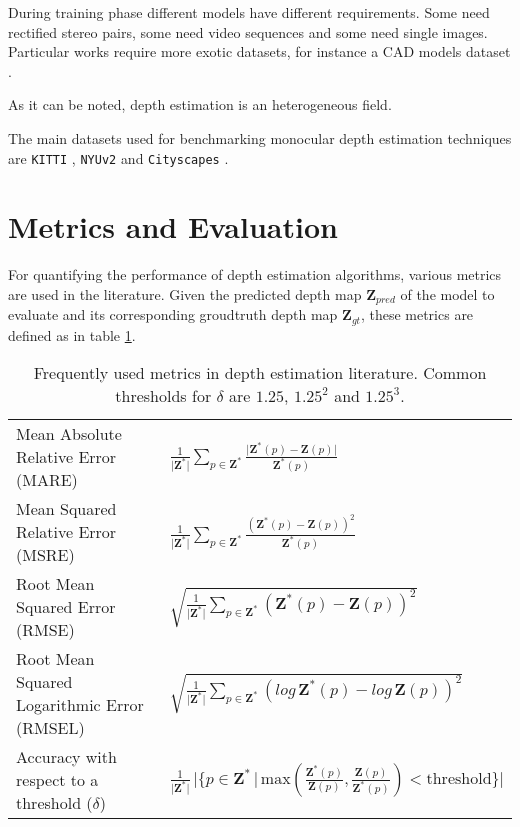 During training phase different models have different requirements. Some need rectified stereo pairs, some need video sequences and some need single images. Particular works require more exotic datasets, for instance a CAD models dataset \cite{IM2CAD}.

As it can be noted, depth estimation is an heterogeneous field.

The main datasets used for benchmarking monocular depth estimation techniques are \texttt{KITTI} \cite{KITTI}, \texttt{NYUv2} \cite{NYUv2} and \texttt{Cityscapes} \cite{Cityscapes}.

\section{Metrics and Evaluation}

For quantifying the performance of depth estimation algorithms, various metrics are used in the literature.
Given the predicted depth map $\mathbf{Z}_{pred}$ of the model to evaluate and its corresponding groudtruth depth map $\mathbf{Z}_{gt}$, these metrics are defined as in table \ref{t:metrics}.

\begingroup
\renewcommand{\arraystretch}{2.}
\begin{table}
	\begin{tabular}{l|l}
	Mean Absolute Relative Error (MARE) & $\frac{1}{\big| \mathbf{Z}^{*} \big|}\sum_{p \in \mathbf{Z}^{*}} \frac {\big| \mathbf{Z}^{*}(p) - \mathbf{Z}(p) \big|} {\mathbf{Z}^{*}(p)}$ \\
	Mean Squared Relative Error (MSRE) & $\frac{1}{\big| \mathbf{Z}^{*} \big|}\sum_{p \in \mathbf{Z}^{*}} \frac {\left( \mathbf{Z}^{*}(p) - \mathbf{Z}(p) \right)^{2}} {\mathbf{Z}^{*}(p)}$ \\
	Root Mean Squared Error (RMSE) & $\sqrt{
		\frac{1}{\big| \mathbf{Z}^{*} \big|}\sum_{p \in \mathbf{Z}^{*}} \left( \mathbf{Z}^{*}(p) - \mathbf{Z}(p) \right)^{2}
	}$ \\
	Root Mean Squared Logarithmic Error (RMSEL) & $\sqrt{
		\frac{1}{\big| \mathbf{Z}^{*} \big|}\sum_{p \in \mathbf{Z}^{*}} \left( log \, \mathbf{Z}^{*}(p) - log \, \mathbf{Z}(p) \right)^{2}
	}$ \\
	Accuracy with respect to a threshold ($\delta$) & $\frac{1}{\big| \mathbf{Z}^{*} \big|} \, \big| \{p \in \mathbf{Z}^{*} \, | \, \text{max}(
		\frac{\mathbf{Z}^{*}(p)}{\mathbf{Z}(p)},
		\frac{\mathbf{Z}(p)}{\mathbf{Z}^{*}(p)}
	) < \text{threshold} \} \big| $\\
	\end{tabular}
\caption{
    Frequently used metrics in depth estimation literature.
    Common thresholds for $\delta$ are $1.25$, $1.25^{2}$ and $1.25^{3}$.
    \label{t:metrics}
}
\end{table}
\endgroup

